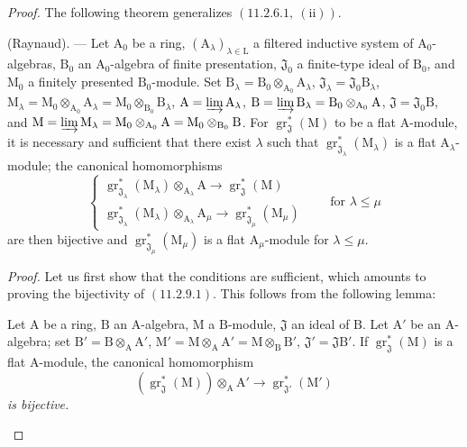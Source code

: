 \begin{proof}
The following theorem generalizes $(11.2.6.1,~(\mathrm{ii}))$.

\begin{theorem}[11.2.9]
\label{IV.11.2.9}
(Raynaud). --- Let $\mathrm{A}_0$ be a ring, $(\mathrm{A}_\lambda)_{\lambda\in\mathrm{L}}$ a filtered inductive system of $\mathrm{A}_0$-algebras, $\mathrm{B}_0$ an $\mathrm{A}_0$-algebra of finite presentation, $\mathfrak{J}_0$ a finite-type ideal of $\mathrm{B}_0$, and $\mathrm{M}_0$ a finitely presented $\mathrm{B}_0$-module. Set $\mathrm{B}_\lambda=\mathrm{B}_0\otimes_{\mathrm{A}_0}\mathrm{A}_\lambda$, $\mathfrak{J}_\lambda=\mathfrak{J}_0\mathrm{B}_\lambda$, $\mathrm{M}_\lambda=\mathrm{M}_0\otimes_{\mathrm{A}_0}\mathrm{A}_\lambda=\mathrm{M}_0\otimes_{\mathrm{B}_0}\mathrm{B}_\lambda$, $\mathrm{A}=\varinjlim\mathrm{A}_\lambda$, $\mathrm{B}=\varinjlim\mathrm{B}_\lambda=\mathrm{B}_0\otimes_{\mathrm{A}_0}\mathrm{A}$, $\mathfrak{J}=\mathfrak{J}_0\mathrm{B}$, and $\mathrm{M}=\varinjlim\mathrm{M}_\lambda=\mathrm{M}_0\otimes_{\mathrm{A}_0}\mathrm{A}=\mathrm{M}_0\otimes_{\mathrm{B}_0}\mathrm{B}$. For $\operatorname{gr}^*_\mathfrak{J}(\mathrm{M})$ to be a flat $\mathrm{A}$-module, it is necessary and sufficient that there exist $\lambda$ such that $\operatorname{gr}^*_{\mathfrak{J}_\lambda}(\mathrm{M}_\lambda)$ is a flat $\mathrm{A}_\lambda$-module; the canonical homomorphisms
\begin{equation}
  \begin{cases}
    \operatorname{gr}^*_{\mathfrak{J}_\lambda}(\mathrm{M}_\lambda)\otimes_{\mathrm{A}_\lambda}\mathrm{A} \to \operatorname{gr}^*_\mathfrak{J}(\mathrm{M}) \\
    \operatorname{gr}^*_{\mathfrak{J}_\lambda}(\mathrm{M}_\lambda)\otimes_{\mathrm{A}_\lambda}\mathrm{A}_\mu \to \operatorname{gr}^*_{\mathfrak{J}_\mu}(\mathrm{M}_\mu)
  \end{cases}
  \qquad\text{for }\lambda\leqslant\mu
  \label{IV.11.2.9.1}
\tag{11.2.9.1}
\end{equation}
are then bijective and $\operatorname{gr}^*_{\mathfrak{J}_\mu}(\mathrm{M}_\mu)$ is a flat $\mathrm{A}_\mu$-module for $\lambda\leqslant\mu$.
\end{theorem}

\medskip
\noindent\emph{Proof.}
Let us first show that the conditions are sufficient, which amounts to proving
the bijectivity of $(11.2.9.1)$. This follows from the following lemma:

\begin{lemma}[11.2.9.2]
\label{IV.11.2.9.2}
Let $\mathrm{A}$ be a ring, $\mathrm{B}$ an $\mathrm{A}$-algebra, $\mathrm{M}$ a $\mathrm{B}$-module, $\mathfrak{J}$ an ideal of $\mathrm{B}$. Let $\mathrm{A}'$ be an $\mathrm{A}$-algebra; set $\mathrm{B}'=\mathrm{B}\otimes_\mathrm{A}\mathrm{A}'$, $\mathrm{M}'=\mathrm{M}\otimes_\mathrm{A}\mathrm{A}'=\mathrm{M}\otimes_\mathrm{B}\mathrm{B}'$, $\mathfrak{J}'=\mathfrak{J}\mathrm{B}'$. If $\operatorname{gr}^*_\mathfrak{J}(\mathrm{M})$ is a flat $\mathrm{A}$-module, the canonical homomorphism
\[
  (\operatorname{gr}^*_\mathfrak{J}(\mathrm{M}))\otimes_\mathrm{A}\mathrm{A}'\to\operatorname{gr}^*_{\mathfrak{J}'}(\mathrm{M}')
\]
\emph{is bijective.}
\end{lemma}


\end{proof}
